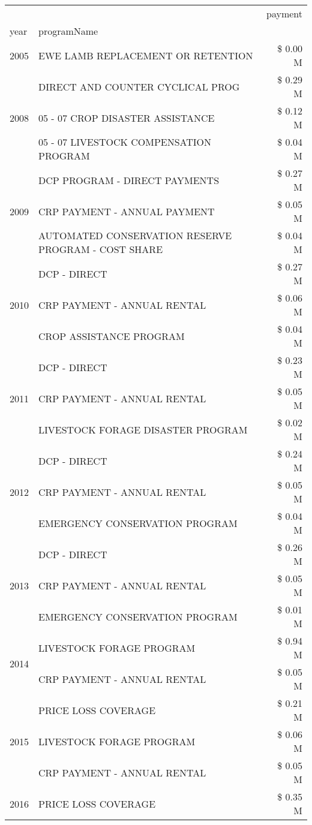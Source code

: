 \begin{tabular}{llr}
\toprule
 &  & payment \\
year & programName &  \\
\midrule
2005 & EWE LAMB REPLACEMENT OR RETENTION & \$ 0.00 M \\
\cline{1-3}
\multirow[t]{3}{*}{2008} & DIRECT AND COUNTER CYCLICAL PROG & \$ 0.29 M \\
 & 05 - 07 CROP DISASTER ASSISTANCE & \$ 0.12 M \\
 & 05 - 07 LIVESTOCK COMPENSATION PROGRAM & \$ 0.04 M \\
\cline{1-3}
\multirow[t]{3}{*}{2009} & DCP PROGRAM - DIRECT PAYMENTS & \$ 0.27 M \\
 & CRP PAYMENT - ANNUAL PAYMENT & \$ 0.05 M \\
 & AUTOMATED CONSERVATION RESERVE PROGRAM - COST SHARE & \$ 0.04 M \\
\cline{1-3}
\multirow[t]{3}{*}{2010} & DCP - DIRECT & \$ 0.27 M \\
 & CRP PAYMENT - ANNUAL RENTAL & \$ 0.06 M \\
 & CROP ASSISTANCE PROGRAM & \$ 0.04 M \\
\cline{1-3}
\multirow[t]{3}{*}{2011} & DCP - DIRECT & \$ 0.23 M \\
 & CRP PAYMENT - ANNUAL RENTAL & \$ 0.05 M \\
 & LIVESTOCK FORAGE DISASTER PROGRAM & \$ 0.02 M \\
\cline{1-3}
\multirow[t]{3}{*}{2012} & DCP - DIRECT & \$ 0.24 M \\
 & CRP PAYMENT - ANNUAL RENTAL & \$ 0.05 M \\
 & EMERGENCY CONSERVATION PROGRAM & \$ 0.04 M \\
\cline{1-3}
\multirow[t]{3}{*}{2013} & DCP - DIRECT & \$ 0.26 M \\
 & CRP PAYMENT - ANNUAL RENTAL & \$ 0.05 M \\
 & EMERGENCY CONSERVATION PROGRAM & \$ 0.01 M \\
\cline{1-3}
\multirow[t]{2}{*}{2014} & LIVESTOCK FORAGE PROGRAM & \$ 0.94 M \\
 & CRP PAYMENT - ANNUAL RENTAL & \$ 0.05 M \\
\cline{1-3}
\multirow[t]{3}{*}{2015} & PRICE LOSS COVERAGE & \$ 0.21 M \\
 & LIVESTOCK FORAGE PROGRAM & \$ 0.06 M \\
 & CRP PAYMENT - ANNUAL RENTAL & \$ 0.05 M \\
\cline{1-3}
\multirow[t]{3}{*}{2016} & PRICE LOSS COVERAGE & \$ 0.35 M \\

\end{tabular}
